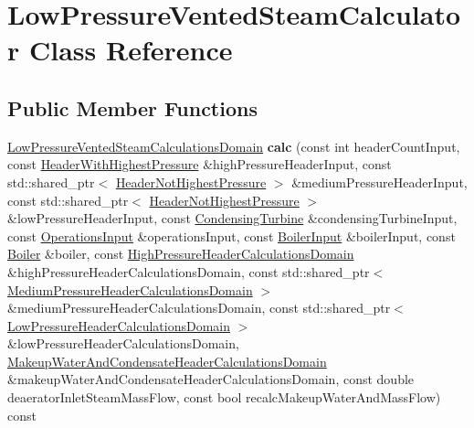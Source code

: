 \hypertarget{class_low_pressure_vented_steam_calculator}{}\section{Low\+Pressure\+Vented\+Steam\+Calculator Class Reference}
\label{class_low_pressure_vented_steam_calculator}
\subsection*{Public Member Functions}
\begin{DoxyCompactItemize}
\item 
\mbox{\label{class_low_pressure_vented_steam_calculator_adf2f6ad050188e14a900208790571c98}} 
\hyperlink{class_low_pressure_vented_steam_calculations_domain}{Low\+Pressure\+Vented\+Steam\+Calculations\+Domain} {\bfseries calc} (const int header\+Count\+Input, const \hyperlink{class_header_with_highest_pressure}{Header\+With\+Highest\+Pressure} \&high\+Pressure\+Header\+Input, const std\+::shared\+\_\+ptr$<$ \hyperlink{class_header_not_highest_pressure}{Header\+Not\+Highest\+Pressure} $>$ \&medium\+Pressure\+Header\+Input, const std\+::shared\+\_\+ptr$<$ \hyperlink{class_header_not_highest_pressure}{Header\+Not\+Highest\+Pressure} $>$ \&low\+Pressure\+Header\+Input, const \hyperlink{class_condensing_turbine}{Condensing\+Turbine} \&condensing\+Turbine\+Input, const \hyperlink{class_operations_input}{Operations\+Input} \&operations\+Input, const \hyperlink{class_boiler_input}{Boiler\+Input} \&boiler\+Input, const \hyperlink{class_boiler}{Boiler} \&boiler, const \hyperlink{class_high_pressure_header_calculations_domain}{High\+Pressure\+Header\+Calculations\+Domain} \&high\+Pressure\+Header\+Calculations\+Domain, const std\+::shared\+\_\+ptr$<$ \hyperlink{class_medium_pressure_header_calculations_domain}{Medium\+Pressure\+Header\+Calculations\+Domain} $>$ \&medium\+Pressure\+Header\+Calculations\+Domain, const std\+::shared\+\_\+ptr$<$ \hyperlink{class_low_pressure_header_calculations_domain}{Low\+Pressure\+Header\+Calculations\+Domain} $>$ \&low\+Pressure\+Header\+Calculations\+Domain, \hyperlink{class_makeup_water_and_condensate_header_calculations_domain}{Makeup\+Water\+And\+Condensate\+Header\+Calculations\+Domain} \&makeup\+Water\+And\+Condensate\+Header\+Calculations\+Domain, const double deaerator\+Inlet\+Steam\+Mass\+Flow, const bool recalc\+Makeup\+Water\+And\+Mass\+Flow) const

\end{DoxyCompactItemize}
